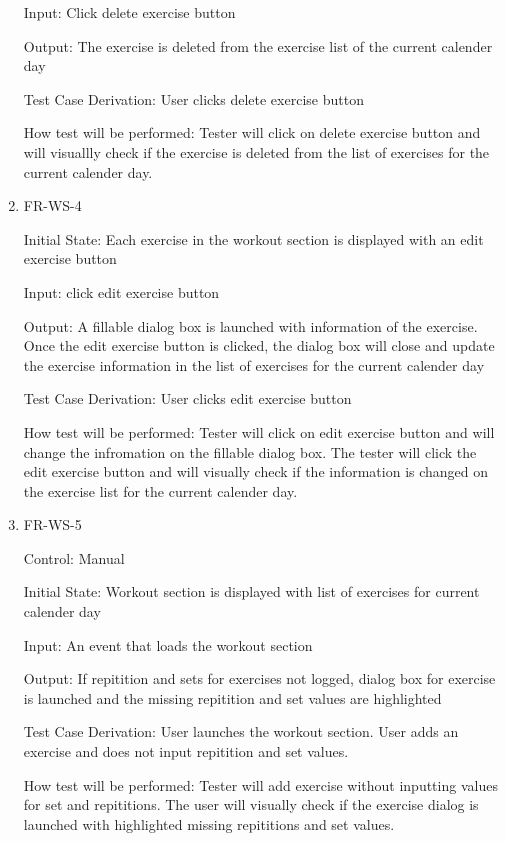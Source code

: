 \documentclass[12pt, titlepage]{article}
\begin{document}
\begin{enumerate}
Input: Click delete exercise button
					
Output: The exercise is deleted from the exercise list of the current calender day

Test Case Derivation: User clicks delete exercise button

How test will be performed: Tester will click on delete exercise button and will visuallly check if the exercise is deleted from the list of exercises for the current calender day. 

\item{FR-WS-4\\}

Initial State: Each exercise in the workout section is displayed with an edit exercise button
					
Input: click edit exercise button
					
Output: A fillable dialog box is launched with information of the exercise. Once the edit exercise button is clicked, the dialog box will close and update the exercise information in the list of exercises for the current calender day

Test Case Derivation: User clicks edit exercise button

How test will be performed: Tester will click on edit exercise button and will change the infromation on the fillable dialog box. The tester will click the edit exercise button and will visually check if the information is changed on the exercise list for the current calender day.

\item{FR-WS-5\\}

Control: Manual
					
Initial State: Workout section is displayed with list of exercises for current calender day
					
Input: An event that loads the workout section
					
Output: If repitition and sets for exercises not logged, dialog box for exercise is launched and the missing repitition and set values are highlighted

Test Case Derivation: User launches the workout section. User adds an exercise and does not input repitition and set values.

How test will be performed: Tester will add exercise without inputting values for set and repititions. The user will visually check if the exercise dialog is launched with highlighted missing repititions and set values.

\end{enumerate}
\end{document}
